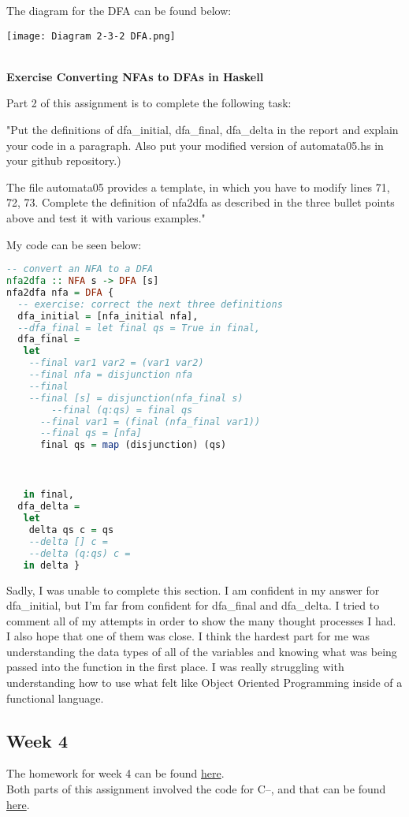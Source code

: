 \documentclass{article}
\theoremstyle{theorem}
\theoremstyle{definition}
\theoremstyle{remark}
\begin{document}
The diagram for the DFA can be found below:
\begin{center}
    \texttt{[image: Diagram 2-3-2 DFA.png]}
\end{center}
\\
\textbf{Exercise Converting NFAs to DFAs in Haskell}

Part 2 of this assignment is to complete the following task:
\begin{center}
"Put the definitions of dfa\_initial, dfa\_final, dfa\_delta in the report and explain your code in a paragraph. Also put your modified version of automata05.hs in your github repository.)

The file automata05 provides a template, in which you have to modify lines 71, 72, 73. Complete the definition of nfa2dfa as described in the three bullet points above and test it with various examples."
\end{center}

My code can be seen below:

\begin{lstlisting}[language=Haskell]
-- convert an NFA to a DFA
nfa2dfa :: NFA s -> DFA [s]
nfa2dfa nfa = DFA {
  -- exercise: correct the next three definitions 
  dfa_initial = [nfa_initial nfa],
  --dfa_final = let final qs = True in final,
  dfa_final = 
   let 
    --final var1 var2 = (var1 var2)
    --final nfa = disjunction nfa
    --final 
    --final [s] = disjunction(nfa_final s)
        --final (q:qs) = final qs
      --final var1 = (final (nfa_final var1))
      --final qs = [nfa]
      final qs = map (disjunction) (qs)
      


   in final,
  dfa_delta = 
   let 
    delta qs c = qs 
    --delta [] c = 
    --delta (q:qs) c = 
   in delta }
\end{lstlisting}

Sadly, I was unable to complete this section. I am confident in my answer for dfa\_initial, but I'm far from confident for dfa\_final and dfa\_delta. 
I tried to comment all of my attempts in order to show the many thought processes I had. 
I also hope that one of them was close. I think the hardest part for me was understanding the data types of all of the variables and knowing what was being passed into the function in the first place. 
I was really struggling with understanding how to use what felt like Object Oriented Programming inside of a functional language. 

\subsection{Week 4}
The homework for week 4 can be found \href{https://hackmd.io/@alexhkurz/HJ4KjezfO}{here}.\\
Both parts of this assignment involved the code for C--, and that can be found \href{https://github.com/alexhkurz/compiler-construction-2022/blob/main/bnfc-tutorial-C--.md}{here}.\\
\end{document}
